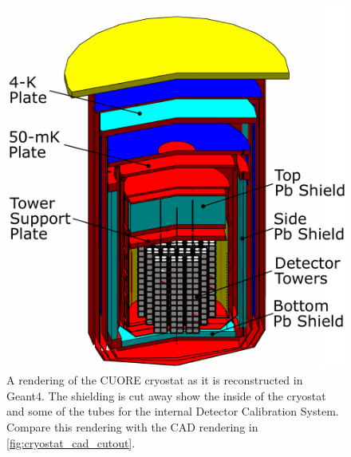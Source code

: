 \begin{figure}[htbp]
    \centering
    \includegraphics[height=0.6\paperheight]{Figures/CUORE_cryostat_labelled.pdf}
    \caption[A rendering of the CUORE crysotat as it is reconstructed in Geant4]
    {A rendering of the CUORE cryostat as it is reconstructed in Geant4.
    The shielding is cut away show the inside of the cryostat and some of the tubes for the internal Detector Calibration System.
    Compare this rendering with the CAD rendering in \autoref{fig:cryostat_cad_cutout}.}
    \label{fig:CUORE_cyrostat_MC}
\end{figure}

